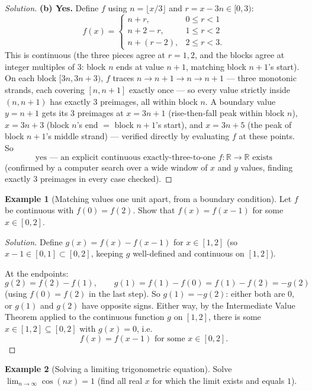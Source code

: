 \documentclass[11pt]{article}
\theoremstyle{definition}
\newtheorem{example}{Example}[section]
\newcommand{\R}{\mathbb{R}}
\begin{document}
\begin{proof}[Solution]
\textbf{(b) Yes.} Define $f$ using $n=\lfloor x/3\rfloor$ and $r=x-3n\in[0,3)$:
\[
f(x)=\begin{cases} n+r, & 0\le r<1\\ n+2-r, & 1\le r<2\\ n+(r-2), & 2\le r<3.\end{cases}
\]
This is continuous (the three pieces agree at $r=1,2$, and the blocks agree at integer multiples of $3$: block $n$ ends at value $n+1$, matching block $n+1$'s start). On each block $[3n,3n+3)$, $f$ traces $n\to n+1\to n\to n+1$ — three monotonic strands, each covering $[n,n+1]$ exactly once — so every value strictly inside $(n,n+1)$ has exactly $3$ preimages, all within block $n$. A boundary value $y=n+1$ gets its $3$ preimages at $x=3n+1$ (rise-then-fall peak within block $n$), $x=3n+3$ (block $n$'s end $=$ block $n{+}1$'s start), and $x=3n+5$ (the peak of block $n{+}1$'s middle strand) — verified directly by evaluating $f$ at these points. So
\[
\boxed{\text{yes — an explicit continuous exactly-three-to-one } f:\R\to\R \text{ exists}}
\]
(confirmed by a computer search over a wide window of $x$ and $y$ values, finding exactly $3$ preimages in every case checked).
\end{proof}

\begin{example}[Matching values one unit apart, from a boundary condition]
Let $f$ be continuous with $f(0)=f(2)$. Show that $f(x)=f(x-1)$ for some $x\in[0,2]$.
\end{example}

\begin{proof}[Solution]
Define $g(x)=f(x)-f(x-1)$ for $x\in[1,2]$ (so $x-1\in[0,1]\subset[0,2]$, keeping $g$ well-defined and continuous on $[1,2]$).

At the endpoints:
\[
g(2)=f(2)-f(1),\qquad g(1)=f(1)-f(0)=f(1)-f(2)=-g(2)
\]
(using $f(0)=f(2)$ in the last step). So $g(1)=-g(2)$: either both are $0$, or $g(1)$ and $g(2)$ have opposite signs. Either way, by the Intermediate Value Theorem applied to the continuous function $g$ on $[1,2]$, there is some $x\in[1,2]\subseteq[0,2]$ with $g(x)=0$, i.e.\
\[
\boxed{f(x)=f(x-1)\text{ for some }x\in[0,2]}.
\]
\end{proof}

\begin{example}[Solving a limiting trigonometric equation]
Solve $\displaystyle\lim_{n\to\infty}\cos(nx)=1$ (find all real $x$ for which the limit exists and equals $1$).
\end{example}
\end{document}
